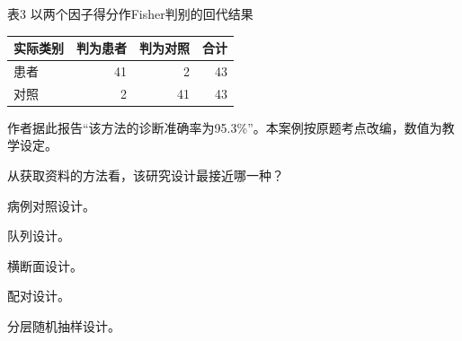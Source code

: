表3 \quad 以两个因子得分作Fisher判别的回代结果

\begin{center}\small\setlength{\tabcolsep}{6pt}\renewcommand{\arraystretch}{1.18}\begin{tabular}{@{}lrrr@{}}
\toprule
实际类别 & 判为患者 & 判为对照 & 合计 \\
\midrule
患者 & 41 & 2 & 43 \\
对照 & 2 & 41 & 43 \\
\bottomrule\end{tabular}\end{center}

作者据此报告``该方法的诊断准确率为95.3\%''。本案例按原题考点改编，数值为教学设定。

\par\addvspace{6pt}\noindent\begin{minipage}{\linewidth}


从获取资料的方法看，该研究设计最接近哪一种？

\begin{choices}

\item 病例对照设计。

\item 队列设计。

\item 横断面设计。

\item 配对设计。

\item 分层随机抽样设计。

\end{choices}

\end{minipage}\par\vspace{4pt}

